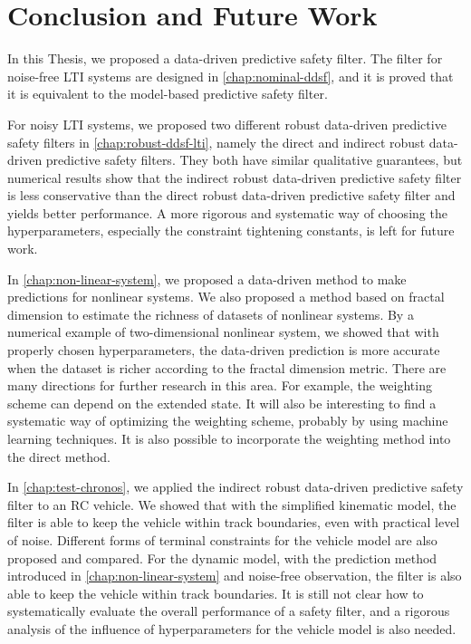 \chapter{Conclusion and Future Work}\label{chap:conclusion}

In this Thesis, we proposed a data-driven predictive safety filter.
The filter for noise-free LTI systems are designed in \cref{chap:nominal-ddsf}, and it is proved that it is equivalent to the model-based predictive safety filter.

For noisy LTI systems, we proposed two different robust data-driven predictive safety filters in \cref{chap:robust-ddsf-lti}, namely the direct and indirect robust data-driven predictive safety filters.
They both have similar qualitative guarantees, but numerical results show that the indirect robust data-driven predictive safety filter is less conservative than the direct robust data-driven predictive safety filter and yields better performance.
A more rigorous and systematic way of choosing the hyperparameters, especially the constraint tightening constants, is left for future work.

In \cref{chap:non-linear-system}, we proposed a data-driven method to make predictions for nonlinear systems.
We also proposed a method based on fractal dimension to estimate the richness of datasets of nonlinear systems.
By a numerical example of two-dimensional nonlinear system, we showed that with properly chosen hyperparameters, the data-driven prediction is more accurate when the dataset is richer according to the fractal dimension metric.
There are many directions for further research in this area.
For example, the weighting scheme can depend on the extended state.
It will also be interesting to find a systematic way of optimizing the weighting scheme, probably by using machine learning techniques.
It is also possible to incorporate the weighting method into the direct method.

In \cref{chap:test-chronos}, we applied the indirect robust data-driven predictive safety filter to an RC vehicle.
We showed that with the simplified kinematic model, the filter is able to keep the vehicle within track boundaries, even with practical level of noise.
Different forms of terminal constraints for the vehicle model are also proposed and compared.
For the dynamic model, with the prediction method introduced in \cref{chap:non-linear-system} and noise-free observation, the filter is also able to keep the vehicle within track boundaries.
It is still not clear how to systematically evaluate the overall performance of a safety filter, and a rigorous analysis of the influence of hyperparameters for the vehicle model is also needed.
